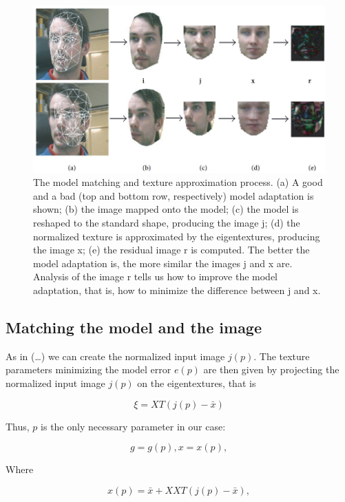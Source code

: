 \documentclass[12pt]{spieman}
\begin{document}
\begin{spacing}{2}
\begin{figure}[H]
    \centering
    \includegraphics[width=130mm]{Figure1.jpg}
    \caption{The model matching and texture approximation process. (a) A good and a bad (top and bottom row, respectively) model adaptation is shown; (b) the image mapped onto the model; (c) the model is reshaped to the standard shape, producing the image j; (d) the normalized texture is approximated by the eigentextures, producing the image x; (e) the residual image r is computed. The better the model adaptation is, the more similar the images j and x are. Analysis of the image r tells us how to improve the model adaptation, that is, how to minimize the difference between j and x.}
    \label{fig1}
\end{figure}



\subsection{Matching the model and the image}{}As in (…) we can create the normalized input image $j(p)$. The texture parameters minimizing the model error $e(p)$ are then given by projecting the normalized input image $j(p)$ on the eigentextures, that is


\begin{equation}
    \xi = XT (j(p)- \bar{x})
\end{equation}

Thus, $p$ is the only necessary parameter in our case:

\begin{equation}
    g = g(p), x = x(p),
\end{equation}

Where

\begin{equation}
    x(p)= \bar{x}+ XXT (j(p)- \bar{x}),
\end{equation}



\end{spacing}
\end{document}
